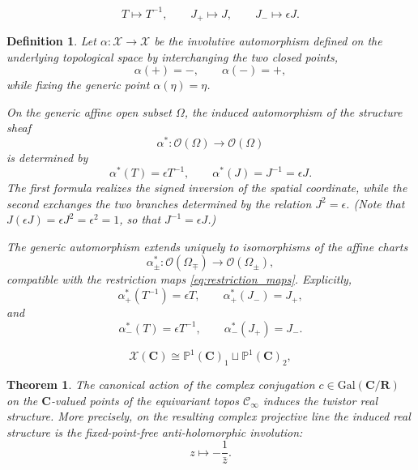 \documentclass[10pt,a4paper]{amsart}
\newtheorem{definition}{Definition}
\newtheorem{theorem}{Theorem}
\newcommand{\C}{\mathbf{C}}
\newcommand{\Gal}{\mathrm{Gal}}
\renewcommand{\P}{\mathbb{P}}
\newcommand{\R}{\mathbf{R}}
\newcommand{\minf}{\mathscr C_\infty}
\begin{document}
\begin{equation}\label{eq:restriction_maps1}
T\longmapsto T^{-1},
\qquad
J_+\longmapsto J,
\qquad
J_-\longmapsto\epsilon J.
\end{equation}

\begin{definition}\label{def:alpha_symmetry}
Let
$
\alpha:\mathcal X\longrightarrow \mathcal X
$
be the involutive automorphism defined on the underlying topological space by
interchanging the two closed points,
\[
\alpha(+)= -,\qquad
\alpha(-)= +,
\]
while fixing the generic point
$
\alpha(\eta)=\eta$.

On the generic affine open subset $\Omega$, the induced automorphism of the
structure sheaf
\[
\alpha^*:\mathcal O(\Omega)\longrightarrow\mathcal O(\Omega)
\]
is determined by
\[
\alpha^*(T)=\epsilon T^{-1},
\qquad
\alpha^*(J)=J^{-1}=\epsilon J.
\]
The first formula realizes the signed inversion of the spatial coordinate,
while the second exchanges the two branches determined by the relation
$J^2=\epsilon$. (Note that
$
J(\epsilon J)=\epsilon J^2=\epsilon^2=1$, 
so that
$
J^{-1}=\epsilon J$.)

The generic automorphism extends uniquely to isomorphisms of the affine
charts
\[
\alpha^*_\pm:
\mathcal O(\Omega_\mp)
\longrightarrow
\mathcal O(\Omega_\pm),
\]
compatible with the restriction maps
\eqref{eq:restriction_maps}. Explicitly,
\[
\alpha_+^*(T^{-1})=\epsilon T,
\qquad
\alpha_+^*(J_-)=J_+,
\]
and
\[
\alpha_-^*(T)=\epsilon T^{-1},
\qquad
\alpha_-^*(J_+)=J_-.
\]
\end{definition}

\begin{equation}\label{twop1}
\mathcal X(\C)\cong
\P^1(\C)_1\sqcup\P^1(\C)_2,
\end{equation}

\begin{theorem}
\label{thm:twistor_space_scheme}
The canonical action of the complex conjugation
$
c\in\Gal(\C/\R)
$
on the $\C$-valued points of the equivariant topos
$\minf$ induces the twistor real structure. More precisely,
on the resulting complex projective line the induced real structure is the
fixed-point-free anti-holomorphic involution:
\[
z\longmapsto-\frac1{\bar z}.
\]
\end{theorem}
\end{document}
